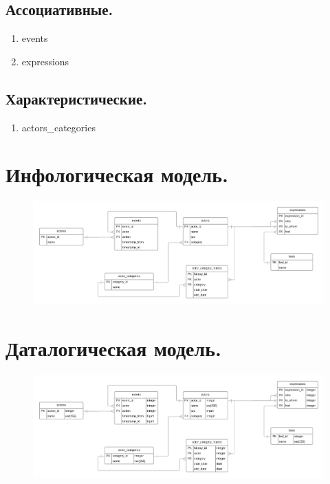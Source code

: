 \subsection{Ассоциативные.}

\begin{enumerate}
    \item events
    \item expressions
\end{enumerate}

\subsection{Характеристические.}

\begin{enumerate}
    \item actors\_categories
\end{enumerate}

\section{Инфологическая модель.}
\begin{figure}[H]
	\centering
	\includegraphics[scale=0.15]{img/info_model}
\end{figure}

\section{Даталогическая модель.}
\begin{figure}[H]
	\centering
	\includegraphics[scale=0.15]{img/data_model}
\end{figure}

